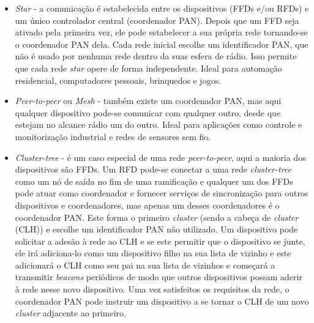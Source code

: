 \documentclass[conference]{IEEEtran}
\begin{document}
\begin{itemize}

 \item \textit{Star} - a comunicação é estabelecida entre os dispositivos (FFDs e/ou RFDs) e um único controlador central (coordenador PAN). Depois que um FFD seja ativado pela primeira vez, ele pode estabelecer a sua própria rede tornando-se o coordenador PAN dela. Cada rede inicial escolhe um identificador PAN, que não é usado por nenhuma rede dentro da suas esfera de rádio. Isso permite que cada rede \textit{star} opere de forma independente. Ideal para automação residencial, computadores pessoais, brinquedos e jogos.
 
 \item \textit{Peer-to-peer} ou \textit{Mesh} - também existe um coordenador PAN, mas aqui qualquer dispositivo pode-se comunicar com qualquer outro, desde que estejam no alcance rádio um do outro. Ideal para aplicações como controle e monitorização industrial e redes de sensores sem fio. 
 
 \item \textit{Cluster-tree} - é um caso especial de uma rede \textit{peer-to-peer}, aqui a maioria dos dispositivos são FFDs. Um RFD pode-se conectar a uma rede \textit{cluster-tree} como um nó de saída no fim de uma ramificação e qualquer um dos FFDs pode atuar como coordenador e fornecer serviços de sincronização para outros dispositivos e coordenadores, mas apenas um desses coordenadores é o coordenador PAN. Este forma o primeiro \textit{cluster} (sendo a cabeça de \textit{cluster} (CLH)) e escolhe um identificador PAN não utilizado. Um dispositivo pode solicitar a adesão à rede ao CLH e se este permitir que o dispositivo se junte, ele irá adiciona-lo como um dispositivo filho na sua lista de vizinho e este adicionará o CLH como seu pai na sua lista de vizinhos e começará a transmitir \textit{beacons} periódicos de modo que outros dispositivos possam aderir à rede nesse novo dispositivo. Uma vez satisfeitos os requisitos da rede, o coordenador PAN pode instruir um dispositivo a se tornar o CLH de um novo \textit{cluster} adjacente ao primeiro. 

\end{itemize}

\end{document}
